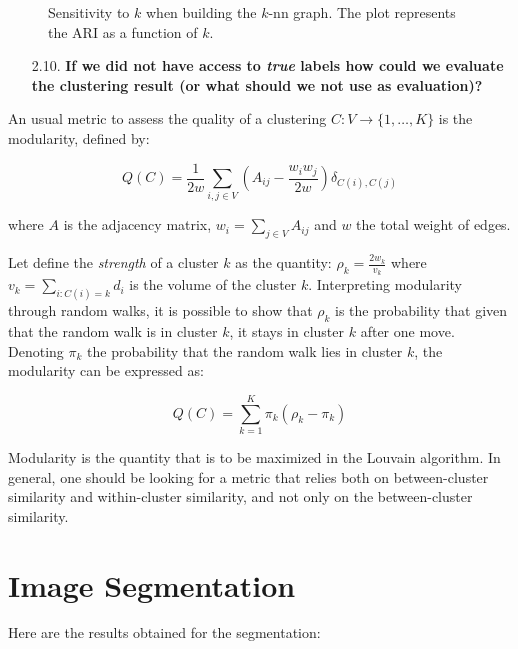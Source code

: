 \documentclass[a4paper, 11pt]{report}
\begin{document}
\begin{figure}[!h]
\begin{minipage}{.45\textwidth}
        \caption{Sensitivity to $k$ when building the $k$-nn graph. The plot represents the ARI as a function of $k$.}
        \label{fig:ari-knn}
    \end{minipage}
    \end{figure}

\begin{itemize}
    \item[2.10.] \textbf{If we did not have access to \textit{true} labels how could we evaluate the clustering result (or what should we not use as evaluation)?}
\end{itemize}

    An usual metric to assess the quality of a clustering $C : V \longrightarrow \lbrace 1, \dots, K \rbrace$ is the modularity, defined by:

    \[ Q(C) = \frac{1}{2w} \sum_{i, j \in V} \left( A_{ij} - \frac{w_{i}w_{j}}{2w} \right) \delta_{C(i), C(j)} \]

    \noindent where $A$ is the adjacency matrix, $w_{i} = \sum_{j \in V} A_{ij}$ and $w$ the total weight of edges.

    Let define the \emph{strength} of a cluster $k$ as the quantity: $\rho_{k} = \frac{2 w_{k}}{v_{k}}$ where $v_{k} = \sum_{i: C(i) = k} d_{i}$ is the volume of the cluster $k$. Interpreting modularity through random walks, it is possible to show that $\rho_{k}$ is the probability that given that the random walk is in cluster $k$, it stays in cluster $k$ after one move. Denoting $\pi_{k}$ the probability that the random walk lies in cluster $k$, the modularity can be expressed as:

    \[ Q(C) = \sum_{k=1}^{K} \pi_{k} \left( \rho_{k} - \pi_{k} \right) \]

    Modularity is the quantity that is to be maximized in the Louvain algorithm. In general, one should be looking for a metric that relies both on between-cluster similarity and within-cluster similarity, and not only on the between-cluster similarity.

\chapter{Image Segmentation}

    Here are the results obtained for the segmentation:
\end{document}
